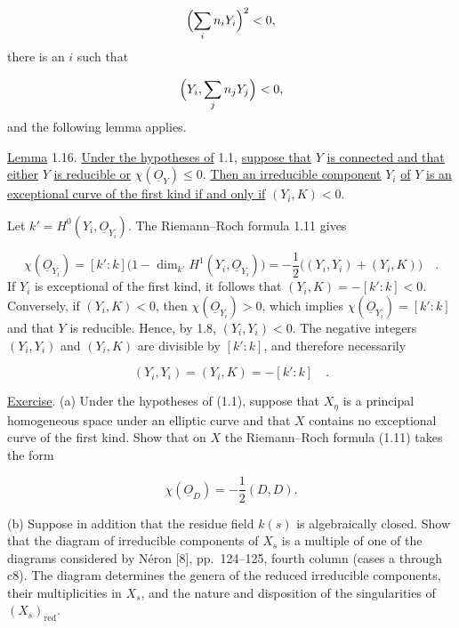 \begin{equation*}
\Bigl(\sum_i n_iY_i\Bigr)^2<0,
\end{equation*}
there is an $i$ such that

\begin{equation*}
\Bigl(Y_i,\sum_j n_jY_j\Bigr)<0,
\end{equation*}
and the following lemma applies.

\underline{Lemma} 1.16. \underline{Under the hypotheses of} 1.1,
\underline{suppose that} $Y$ \underline{is connected and that either} $Y$
\underline{is reducible or} $\chi(\underline{O}_Y)\leq0$.
\underline{Then an irreducible component} $Y_i$ \underline{of} $Y$
\underline{is an exceptional curve of the first kind if and only if}
$(Y_i,K)<0$.

Let $k'=H^0(Y_i,\underline{O}_{Y_i})$.  The Riemann--Roch formula 1.11 gives

\begin{equation*}
\chi(\underline{O}_{Y_i})
=[k':k]\bigl(1-\dim_{k'}H^1(Y_i,\underline{O}_{Y_i})\bigr)
=-\frac12\bigl((Y_i,Y_i)+(Y_i,K)\bigr) \quad .
\end{equation*}
If $Y_i$ is exceptional of the first kind, it follows that
$(Y_i,K)=-[k':k]<0$.  Conversely, if $(Y_i,K)<0$, then
$\chi(\underline{O}_{Y_i})>0$, which implies
$\chi(\underline{O}_{Y_i})=[k':k]$ and that $Y$ is reducible.  Hence, by 1.8,
$(Y_i,Y_i)<0$.  The negative integers $(Y_i,Y_i)$ and $(Y_i,K)$ are divisible by
$[k':k]$, and therefore necessarily

\begin{equation*}
(Y_i,Y_i)=(Y_i,K)=-[k':k] \quad .
\end{equation*}

\underline{Exercise}. (a) Under the hypotheses of (1.1), suppose that $X_\eta$ is
a principal homogeneous space under an elliptic curve and that $X$ contains no
exceptional curve of the first kind.  Show that on $X$ the Riemann--Roch formula
(1.11) takes the form

\begin{equation*}
\chi(\underline{O}_D)=-\frac12(D,D).
\end{equation*}


(b) Suppose in addition that the residue field $k(s)$ is algebraically closed.
Show that the diagram of irreducible components of $X_s$ is a multiple of one of
the diagrams considered by Néron [8], pp.~124--125, fourth column (cases a through
c8).  The diagram determines the genera of the reduced irreducible components,
their multiplicities in $X_s$, and the nature and disposition of the singularities
of $(X_s)_{\mathrm{red}}$.

